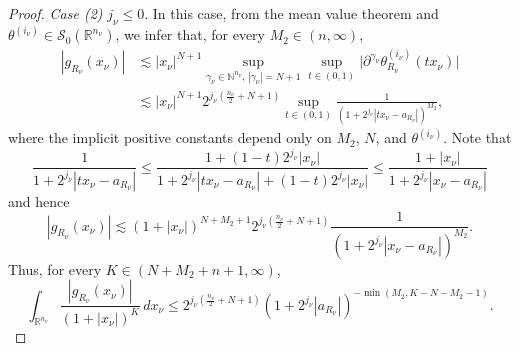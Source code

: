 \documentclass[11pt, reqno]{amsart}
\theoremstyle{definition}
\theoremstyle{remark}
\numberwithin{equation}{section}
\begin{document}
\begin{proof}
\emph{Case (2)} $j_{\nu}\leq 0$. In this case,
from the mean value theorem and $\theta^{(i_\nu)}\in\mathscr S_0(\mathbb R^{n_\nu})$,
we infer that, for every $M_2\in (n,\infty)$,
\begin{equation*}
\begin{split}
|g_{R_\nu}(x_\nu)|
&\lesssim |x_\nu|^{N+1} \sup_{\gamma_\nu\in\mathbb N^{n_\nu},\,|\gamma_\nu|=N+1}
\sup_{t\in(0,1)}
\Big|\partial^{\gamma_\nu} \theta^{(i_\nu)}_{R_\nu}(t x_\nu)\Big|\\
&\lesssim |x_\nu|^{N+1} 2^{j_\nu (\frac{n_\nu}2 + N+1)}
\sup_{t\in(0,1)} \frac{1}{(1+2^{j_\nu}|t x_\nu-a_{R_\nu}|)^{M_2}},
\end{split}
\end{equation*}
where the implicit positive constants depend only on $M_2$, $N$, and $\theta^{(i_\nu)}$.
Note that
\begin{equation*}
\frac{1}{1+2^{j_\nu}|t x_\nu-a_{R_\nu}|}
\leq \frac{1+(1-t)2^{j_\nu}|x_\nu|}{1+2^{j_\nu}|t x_\nu-a_{R_\nu}|+(1-t)2^{j_\nu}|x_\nu|}
\leq \frac{1+|x_\nu|}{1+2^{j_\nu}| x_\nu-a_{R_\nu}|}
\end{equation*}
and hence
\begin{equation*}
|g_{R_\nu}(x_\nu)|
\lesssim (1+|x_\nu|)^{N+M_2+1} 2^{j_\nu (\frac{n_\nu}2 + N+1)}
\frac{1}{(1+2^{j_\nu}|x_\nu-a_{R_\nu}|)^{M_2}}.
\end{equation*}
Thus, for every $K\in(N+M_2+n+1,\infty)$,
\begin{equation}\label{j<0}
\int_{\mathbb R^{n_\nu}} \frac{|g_{R_\nu}(x_\nu)|}{(1+|x_\nu|)^K} \,dx_\nu
\leq 2^{j_\nu (\frac{n_\nu}2 + N+1)}  (1+2^{j_\nu}|a_{R_\nu}|)^{-\min(M_2,K-N-M_2-1)}.
\end{equation}


\end{proof}
\end{document}
